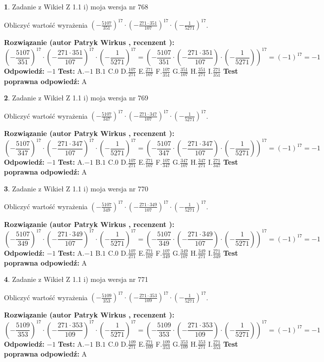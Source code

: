\documentclass[12pt, a4paper]{article}
\theoremstyle{definition} %
\newtheorem{zad}{}
\newcommand{\zadStart}[1]{\begin{zad}#1\newline}
\newcommand{\zadStop}{\end{zad}}
\newcommand{\rozwStart}[2]{\noindent \textbf{Rozwiązanie (autor #1 , recenzent #2): }\newline}
\newcommand{\rozwStop}{\newline}
\newcommand{\odpStart}{\noindent \textbf{Odpowiedź:}\newline}
\newcommand{\odpStop}{\newline}
\newcommand{\testStart}{\noindent \textbf{Test:}\newline}
\newcommand{\testStop}{\newline}
\newcommand{\kluczStart}{\noindent \textbf{Test poprawna odpowiedź:}\newline}
\newcommand{\kluczStop}{\newline}
\begin{document}
\zadStart{Zadanie z Wikieł Z 1.1 i) moja wersja nr 768}

Obliczyć wartość wyrażenia $(-\frac{5107}{351})^{17} \cdot (-\frac{271 \cdot 351}{107})^{17} \cdot (-\frac{1}{5271})^{17}$.
\zadStop
\rozwStart{Patryk Wirkus}{}
$$(-\frac{5107}{351})^{17} \cdot (-\frac{271 \cdot 351}{107})^{17} \cdot (-\frac{1}{5271})^{17} = (-\frac{5107}{351} \cdot (-\frac{271 \cdot 351}{107}) \cdot (-\frac{1}{5271}))^{17} = (-1)^{17} = -1$$
\rozwStop
\odpStart
$-1$
\odpStop
\testStart
A.$-1$ B.$1$ C.$0$ D.$\frac{107}{271}$ E.$\frac{271}{107}$
F.$\frac{107}{351}$ G.$\frac{351}{107}$
H.$\frac{351}{271}$
I.$\frac{271}{351}$
\testStop
\kluczStart
A
\kluczStop



\zadStart{Zadanie z Wikieł Z 1.1 i) moja wersja nr 769}

Obliczyć wartość wyrażenia $(-\frac{5107}{347})^{17} \cdot (-\frac{271 \cdot 347}{107})^{17} \cdot (-\frac{1}{5271})^{17}$.
\zadStop
\rozwStart{Patryk Wirkus}{}
$$(-\frac{5107}{347})^{17} \cdot (-\frac{271 \cdot 347}{107})^{17} \cdot (-\frac{1}{5271})^{17} = (-\frac{5107}{347} \cdot (-\frac{271 \cdot 347}{107}) \cdot (-\frac{1}{5271}))^{17} = (-1)^{17} = -1$$
\rozwStop
\odpStart
$-1$
\odpStop
\testStart
A.$-1$ B.$1$ C.$0$ D.$\frac{107}{271}$ E.$\frac{271}{107}$
F.$\frac{107}{347}$ G.$\frac{347}{107}$
H.$\frac{347}{271}$
I.$\frac{271}{347}$
\testStop
\kluczStart
A
\kluczStop



\zadStart{Zadanie z Wikieł Z 1.1 i) moja wersja nr 770}

Obliczyć wartość wyrażenia $(-\frac{5107}{349})^{17} \cdot (-\frac{271 \cdot 349}{107})^{17} \cdot (-\frac{1}{5271})^{17}$.
\zadStop
\rozwStart{Patryk Wirkus}{}
$$(-\frac{5107}{349})^{17} \cdot (-\frac{271 \cdot 349}{107})^{17} \cdot (-\frac{1}{5271})^{17} = (-\frac{5107}{349} \cdot (-\frac{271 \cdot 349}{107}) \cdot (-\frac{1}{5271}))^{17} = (-1)^{17} = -1$$
\rozwStop
\odpStart
$-1$
\odpStop
\testStart
A.$-1$ B.$1$ C.$0$ D.$\frac{107}{271}$ E.$\frac{271}{107}$
F.$\frac{107}{349}$ G.$\frac{349}{107}$
H.$\frac{349}{271}$
I.$\frac{271}{349}$
\testStop
\kluczStart
A
\kluczStop



\zadStart{Zadanie z Wikieł Z 1.1 i) moja wersja nr 771}

Obliczyć wartość wyrażenia $(-\frac{5109}{353})^{17} \cdot (-\frac{271 \cdot 353}{109})^{17} \cdot (-\frac{1}{5271})^{17}$.
\zadStop
\rozwStart{Patryk Wirkus}{}
$$(-\frac{5109}{353})^{17} \cdot (-\frac{271 \cdot 353}{109})^{17} \cdot (-\frac{1}{5271})^{17} = (-\frac{5109}{353} \cdot (-\frac{271 \cdot 353}{109}) \cdot (-\frac{1}{5271}))^{17} = (-1)^{17} = -1$$
\rozwStop
\odpStart
$-1$
\odpStop
\testStart
A.$-1$ B.$1$ C.$0$ D.$\frac{109}{271}$ E.$\frac{271}{109}$
F.$\frac{109}{353}$ G.$\frac{353}{109}$
H.$\frac{353}{271}$
I.$\frac{271}{353}$
\testStop
\kluczStart
A
\kluczStop
\end{document}
